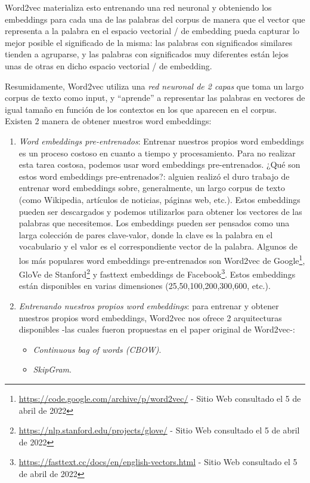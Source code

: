 \documentclass[12pt,a4paper]{article}
\begin{document}
\begin{sloppypar}
Word2vec materializa esto entrenando una red neuronal y obteniendo los embeddings para cada una de las palabras del corpus de manera que el vector que representa a la palabra en el espacio vectorial / de embedding pueda capturar lo mejor posible el significado de la misma: las palabras con significados similares tienden a agruparse, y las palabras con significados muy diferentes están lejos unas de otras en dicho espacio vectorial / de embedding.

Resumidamente, Word2vec utiliza una \textit{red neuronal de 2 capas} que toma un largo corpus de texto como input, y “aprende” a representar las palabras en vectores de igual tamaño en función de los contextos en los que aparecen en el corpus. 
\\

Existen 2 manera de obtener nuestros word embeddings\cite{NLP_26}: 
\begin{enumerate}

\item \textit{Word embeddings pre-entrenados}: Entrenar nuestros propios word embeddings es un proceso costoso en cuanto a tiempo y procesamiento. Para no realizar esta tarea costosa, podemos usar word embeddings pre-entrenados. ¿Qué son estos word embeddings pre-entrenados?: alguien realizó el duro trabajo de entrenar word embeddings sobre, generalmente, un largo corpus de texto (como Wikipedia, artículos de noticias, páginas web, etc.). Estos embeddings pueden ser descargados y podemos utilizarlos para obtener los vectores de las palabras que necesitemos. Los embeddings pueden ser pensados como una larga colección de pares clave-valor, donde la clave es la palabra en el vocabulario y el valor es el correspondiente vector de la palabra. Algunos de los más populares word embeddings pre-entrenados son Word2vec de Google\footnote{\url{https://code.google.com/archive/p/word2vec/} - Sitio Web consultado el 5 de abril de 2022}, GloVe de Stanford\footnote{\url{https://nlp.stanford.edu/projects/glove/} - Sitio Web consultado el 5 de abril de 2022} y fasttext embeddings de Facebook\footnote{\url{https://fasttext.cc/docs/en/english-vectors.html} - Sitio Web consultado el 5 de abril de 2022}. Estos embeddings están disponibles en varias dimensiones (25,50,100,200,300,600, etc.).

\cleardoublepage

\item \textit{Entrenando nuestros propios word embeddings}: para entrenar y obtener nuestros propios word embeddings, Word2vec nos ofrece 2 arquitecturas disponibles -las cuales fueron propuestas en el paper original de Word2vec\cite{NLP_11}-:
\begin{itemize}
\item \textit{Continuous bag of words (CBOW)}.
\item \textit{SkipGram}.
\end{itemize}


\end{enumerate}
\end{sloppypar}
\end{document}
